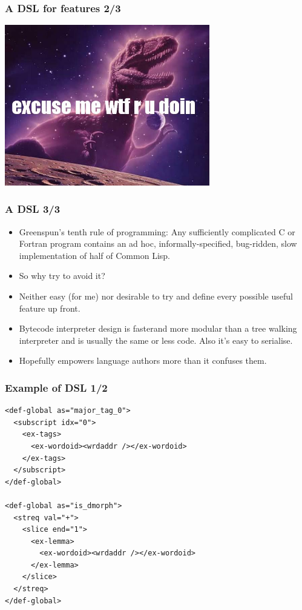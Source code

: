 \documentclass{beamer}
\begin{document}
\begin{frame}
\frametitle{A DSL for features 2/3}
\begin{center}
  \includegraphics[height=7cm]{excuse-me-wtf-are-you-doing.jpg}
\end{center}
\end{frame}

\begin{frame}
\frametitle{A DSL 3/3}
\begin{itemize}

  \item Greenspun's tenth rule of programming: Any sufficiently complicated C
    or Fortran program contains an ad hoc, informally-specified, bug-ridden,
    slow implementation of half of Common Lisp.

  \item So why try to avoid it?

  \item Neither easy (for me) nor desirable to try and define every possible
    useful feature up front.

  \item Bytecode interpreter design is fasterand more modular than a tree
    walking interpreter and is usually the same or less code. Also it's easy to
    serialise.

  \item Hopefully empowers language authors more than it confuses them.

\end{itemize}
\end{frame}

\begin{frame}[fragile]
\frametitle{Example of DSL 1/2}
{\scriptsize
\begin{verbatim}
<def-global as="major_tag_0">
  <subscript idx="0">
    <ex-tags>
      <ex-wordoid><wrdaddr /></ex-wordoid>
    </ex-tags>
  </subscript>
</def-global>

<def-global as="is_dmorph">
  <streq val="+">
    <slice end="1">
      <ex-lemma>
        <ex-wordoid><wrdaddr /></ex-wordoid>
      </ex-lemma>
    </slice>
  </streq>
</def-global>
\end{verbatim}
}

\end{frame}
\end{document}
